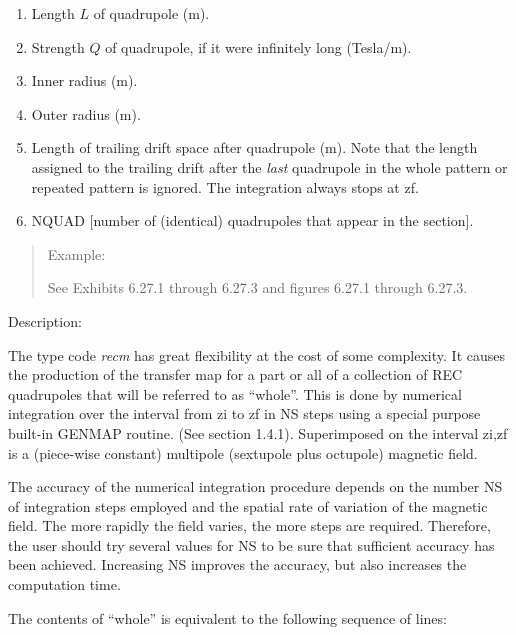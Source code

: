 \begin{enumerate}
  \item  Length $L$ of quadrupole (m).
  \item  Strength $Q$ of quadrupole, if it were infinitely long (Tesla/m).
  \item  Inner radius (m).
  \item  Outer radius (m).
  \item  Length of trailing drift space after quadrupole (m).  Note that
the length assigned to the trailing drift after the {\em last} quadrupole in the whole pattern or repeated pattern is ignored.  The integration always stops at zf.
  \item  NQUAD [number of (identical) quadrupoles that appear in the section].
\end{enumerate}

\vspace{5mm}
\begin{quotation}
\noindent     Example:

    See Exhibits 6.27.1 through 6.27.3 and figures 6.27.1 through 6.27.3.
\end{quotation}

\vspace{5mm}
     Description:
\vspace{2mm}

     The type code {\em recm} has great flexibility at the cost of some
complexity.  It causes the production of the transfer map for a part or
all of a collection of REC quadrupoles that will be referred to as
``whole''.  This is done by numerical integration over the interval from
zi to zf in NS steps using a special purpose built-in GENMAP routine.
(See section 1.4.1).  Superimposed on the interval zi,zf is a (piece-wise
constant) multipole (sextupole plus octupole) magnetic field.

     The accuracy of the numerical integration procedure depends on the number NS of integration steps employed and the spatial rate of variation of the magnetic field.  The more rapidly the field varies, the more steps are required.  Therefore, the user should try several values for NS to be sure that sufficient accuracy has been achieved.  Increasing NS improves the accuracy, but also increases the computation time.

     The contents of ``whole'' is equivalent to the following sequence of \linebreak
     \Mary lines:


